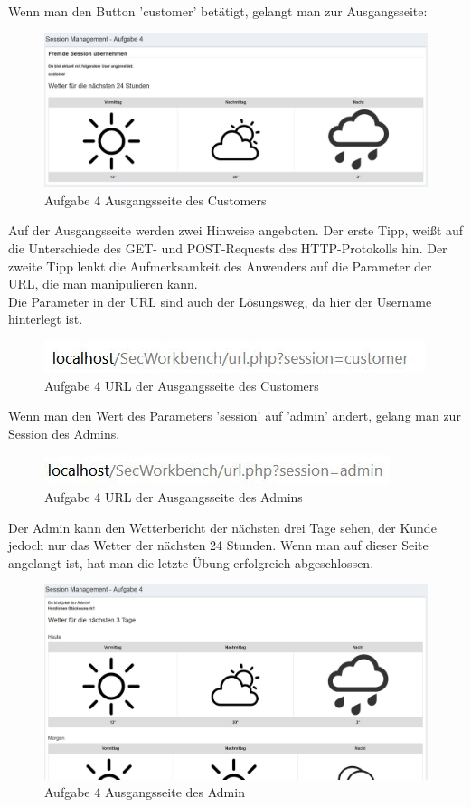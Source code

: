 Wenn man den Button 'customer' betätigt, gelangt man zur Ausgangsseite:
\begin{figure}[H]
	\includegraphics[width=1.0\linewidth]{images/BrokenAuthenticationAndSessionManagement/URL_customer}
	\caption[URL]{Aufgabe 4 Ausgangsseite des Customers}
	\label{fig:Aufgabe 4 Ausgangsseite des Customers}
\end{figure}
Auf der Ausgangsseite werden zwei Hinweise angeboten. Der erste Tipp, weißt auf die Unterschiede des GET- und POST-Requests des HTTP-Protokolls hin. Der zweite Tipp lenkt die Aufmerksamkeit des Anwenders auf die Parameter der URL, die man manipulieren kann.\\
Die Parameter in der URL sind auch der Lösungsweg, da hier der Username hinterlegt ist.
\begin{figure}[H]
	\includegraphics[width=1.0\linewidth]{images/BrokenAuthenticationAndSessionManagement/URL_customer_url}
	\caption[URL]{Aufgabe 4 URL der Ausgangsseite des Customers}
	\label{fig:Aufgabe 4 URL der Ausgangsseite des Customers}
\end{figure} 
Wenn man den Wert des Parameters 'session' auf 'admin' ändert, gelang man zur Session des Admins.
\begin{figure}[H]
	\includegraphics[width=1.0\linewidth]{images/BrokenAuthenticationAndSessionManagement/URL_admin_url}
	\caption[URL]{Aufgabe 4 URL der Ausgangsseite des Admins}
	\label{fig:Aufgabe 4 URL der Ausgangsseite des Admins}
\end{figure}
Der Admin kann den Wetterbericht der nächsten drei Tage sehen, der Kunde jedoch nur das Wetter der nächsten 24 Stunden. Wenn man auf dieser Seite angelangt ist, hat man die letzte Übung erfolgreich abgeschlossen.
\begin{figure}[H]
	\includegraphics[width=1.0\linewidth]{images/BrokenAuthenticationAndSessionManagement/URL_admin}
	\caption[URL]{Aufgabe 4 Ausgangsseite des Admin}
	\label{fig:Aufgabe 4 Ausgangsseite des Admin}
\end{figure}